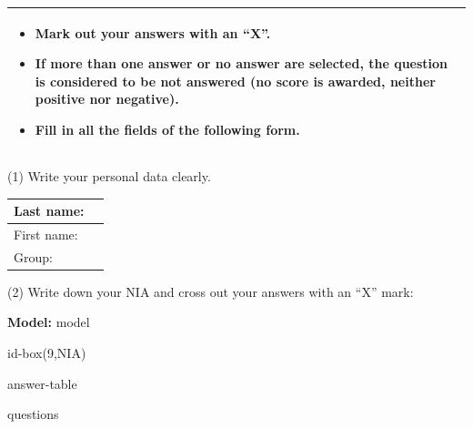 \documentclass[a4paper,11pt]{article}
\begin{document}
\begin{center}
\begin{tabular}{|p{}|}
\hline
\begin{itemize}
\item Mark out your answers with an ``X''.
\item If more than one answer or no answer are selected, the question is considered to be not answered (no score is awarded, neither positive nor negative).
\item Fill in \textbf{all the fields} of the following form.
\end{itemize}
\\

\hline
\end{tabular}
\end{center}

\vspace{0.2cm}


\begin{center}
(1) Write your personal data clearly. 
\end{center}

\begin{center}
\large

\begin{tabular}{|l|p{12cm}|}
\hline
Last name:   &  \\
\hline
First name: &    \\
\hline
Group:   &  \\
\hline
\end{tabular}
\end{center}

\vspace{0.2cm}

\begin{center}
(2) Write down your NIA and cross out your answers with an ``X'' mark:
\end{center}

\begin{center}
\large
\textbf{Model:} {{model}}
\end{center}

{{id-box(9,NIA)}}

{{answer-table}}

\clearpage

{{questions}}
\end{document}
